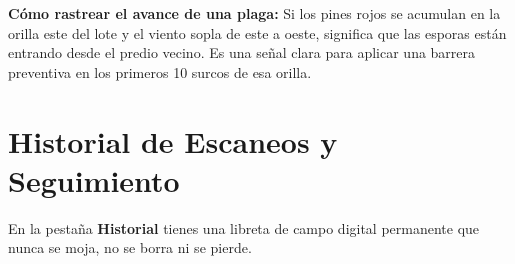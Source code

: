 \documentclass[11pt,a4paper]{report}
\begin{document}
\vspace{3mm}
\begin{campotip}
    \textbf{Cómo rastrear el avance de una plaga:} Si los pines rojos se acumulan en la orilla este del lote y el viento sopla de este a oeste, significa que las esporas están entrando desde el predio vecino. Es una señal clara para aplicar una barrera preventiva en los primeros 10 surcos de esa orilla.
\end{campotip}

\chapter{Historial de Escaneos y Seguimiento}

En la pestaña \textbf{Historial} tienes una libreta de campo digital permanente que nunca se moja, no se borra ni se pierde.
\end{document}
